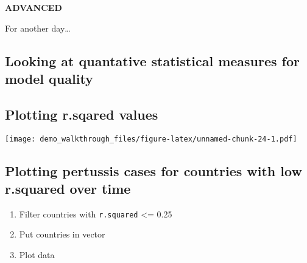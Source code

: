\documentclass[]{article}
\newenvironment{Shaded}{\begin{snugshade}}{\end{snugshade}}
\newcommand{\KeywordTok}[1]{\textcolor[rgb]{0.13,0.29,0.53}{\textbf{#1}}}
\newcommand{\DataTypeTok}[1]{\textcolor[rgb]{0.13,0.29,0.53}{#1}}
\newcommand{\StringTok}[1]{\textcolor[rgb]{0.31,0.60,0.02}{#1}}
\newcommand{\OtherTok}[1]{\textcolor[rgb]{0.56,0.35,0.01}{#1}}
\newcommand{\OperatorTok}[1]{\textcolor[rgb]{0.81,0.36,0.00}{\textbf{#1}}}
\newcommand{\NormalTok}[1]{#1}
\providecommand{\tightlist}{%
  \setlength{\itemsep}{0pt}\setlength{\parskip}{0pt}}
\begin{document}
\textbf{ADVANCED}

For another day\ldots{}

\subsection{Looking at quantative statistical measures for model
quality}\label{looking-at-quantative-statistical-measures-for-model-quality}

\begin{Shaded}
\end{Shaded}

\subsection{Plotting r.sqared values}\label{plotting-r.sqared-values}

\texttt{[image: demo\_walkthrough\_files/figure-latex/unnamed-chunk-24-1.pdf]}

\subsection{Plotting pertussis cases for countries with low r.squared
over
time}\label{plotting-pertussis-cases-for-countries-with-low-r.squared-over-time}

\begin{enumerate}
\def\labelenumi{\arabic{enumi}.}
\tightlist
\item
  Filter countries with \texttt{r.squared} \textless{}= 0.25
\item
  Put countries in vector
\item
  Plot data
\end{enumerate}
\end{document}
